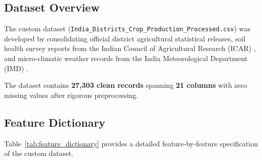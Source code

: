 \documentclass[11pt,a4paper]{article}
\begin{document}
\subsection{Dataset Overview}
The custom dataset (\texttt{India\_Districts\_Crop\_Production\_Processed.csv}) was developed by consolidating official district agricultural statistical releases, soil health survey reports from the Indian Council of Agricultural Research (ICAR) \cite{soilhealthportal}, and micro-climatic weather records from the India Meteorological Department (IMD) \cite{imdclimate}.

The dataset contains \textbf{27,303 clean records} spanning \textbf{21 columns} with zero missing values after rigorous preprocessing.

\subsection{Feature Dictionary}
Table~\ref{tab:feature_dictionary} provides a detailed feature-by-feature specification of the custom dataset.
\end{document}
